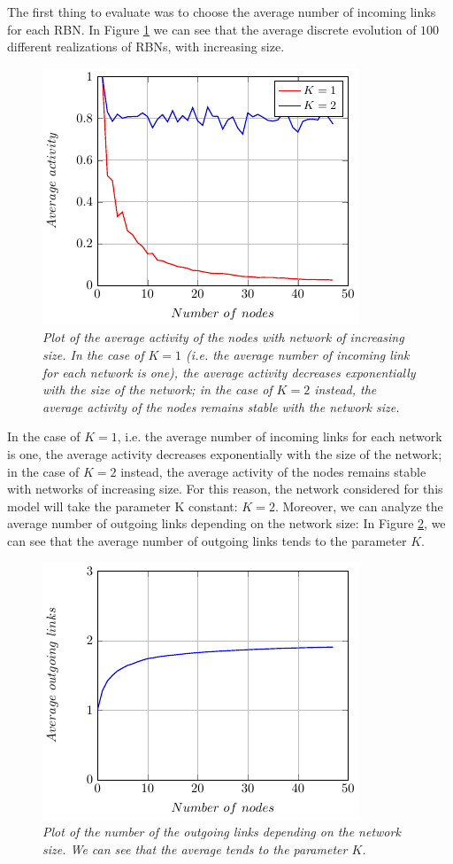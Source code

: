 The first thing to evaluate was to choose the average number of incoming links for each RBN. In Figure \ref{fig:K} we can see that the average discrete evolution of $100$ different realizations of RBNs, with increasing size.
\begin{figure}[h]
\centering
\includegraphics[scale=1.5]{images/K.pdf}
\caption{\emph{Plot of the average activity of the nodes with network of increasing size.
In the case of $K=1$ (i.e. the average number of incoming link for each network is one), the average activity decreases exponentially with the size of the network; in the case of $K=2$ instead, the average activity of the nodes remains stable with the network size.}}
\label{fig:K}
\end{figure}
In the case of $K=1$, i.e. the average number of incoming links for each network is one, the average activity decreases exponentially with the size of the network; in the case of $K=2$ instead, the average activity of the nodes remains stable with networks of increasing size. For this reason, the network considered for this model will take the parameter K constant: $K=2$.
Moreover, we can analyze the average number of outgoing links depending on the network size: In Figure \ref{fig:outgoing}, we can see that the average number of outgoing links tends to the parameter $K$.
\begin{figure}[h]
\centering
\includegraphics[scale=1.5]{images/outgoing.pdf}
\caption{\emph{Plot of the number of the outgoing links depending on the network size. We can see that the average tends to the parameter $K$. }}
\label{fig:outgoing}
\end{figure}
